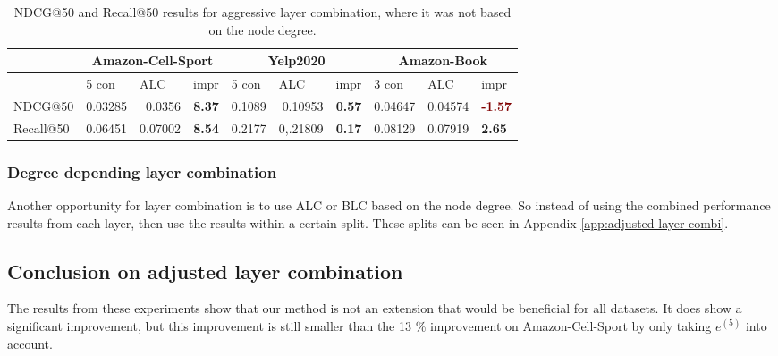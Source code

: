 \begin{table*}[h!]
    \centering
    \begin{tabular}{|l|r|r|r||l|r|r||l|l|l|}
        \hline
                  & \multicolumn{3}{c||}{Amazon-Cell-Sport} & \multicolumn{3}{c||}{Yelp2020} & \multicolumn{3}{c|}{Amazon-Book}                                                                                                                                                                  \\ \hline
                  & \multicolumn{1}{l|}{5 con}              & \multicolumn{1}{l|}{ALC}       & \multicolumn{1}{l||}{impr}            & \multicolumn{1}{l|}{5 con} & \multicolumn{1}{l|}{ALC} & \multicolumn{1}{l||}{impr}            & 3 con   & ALC     & impr                                  \\ \hline
        NDCG@50   & 0.03285                                 & 0.0356                         & \textbf{\textcolor{OliveGreen}{8.37}} & 0.1089                     & 0.10953                  & \textbf{\textcolor{OliveGreen}{0.57}} & 0.04647 & 0.04574 & \textbf{\textcolor{Maroon}{-1.57}}    \\ \hline
        Recall@50 & 0.06451                                 & 0.07002                        & \textbf{\textcolor{OliveGreen}{8.54}} & 0.2177                     & 0,.21809                 & \textbf{\textcolor{OliveGreen}{0.17}} & 0.08129 & 0.07919 & \textbf{\textcolor{OliveGreen}{2.65}} \\ \hline
    \end{tabular}
    \caption{NDCG@50 and Recall@50 results for aggressive layer combination, where it was not based on the node degree.}
    \label{tab:aggressive-layer-combination}
\end{table*}

\subsubsection{Degree depending layer combination}
Another opportunity for layer combination is to use ALC or BLC based on the node degree.
So instead of using the combined performance results from each layer, then use the results within a certain split.
These splits can be seen in Appendix \autoref{app:adjusted-layer-combi}. 

\subsection{Conclusion on adjusted layer combination}
The results from these experiments show that our method is not an extension that would be beneficial for all datasets.
It does show a significant improvement, but this improvement is still smaller than the 13 \% improvement on Amazon-Cell-Sport by only taking $e^{(5)}$ into account.
